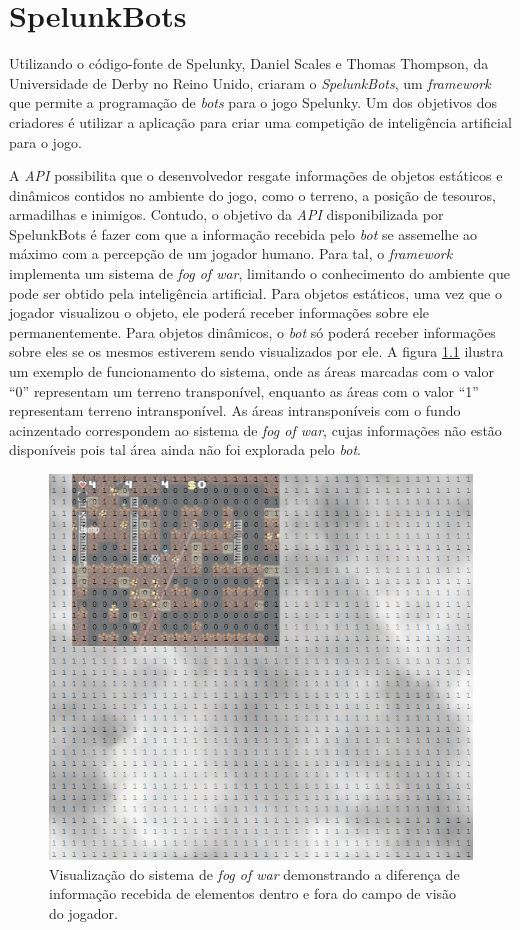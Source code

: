 \chapter{\label{chap:spelunkbots}SpelunkBots}

Utilizando o código-fonte de Spelunky, Daniel Scales e Thomas Thompson, da
Universidade de Derby no Reino Unido, criaram o
\textit{SpelunkBots}\cite{SPELUNKBOTSPAPER}, um
\textit{framework} que permite a programação de \textit{bots} para o jogo
Spelunky. Um dos objetivos dos criadores é utilizar a aplicação para criar uma
competição de inteligência artificial para o jogo.

A \textit{API} possibilita que o desenvolvedor resgate informações de objetos
estáticos e dinâmicos contidos no ambiente do jogo, como o terreno, a
posição de tesouros, armadilhas e inimigos. Contudo, o objetivo da \textit{API}
disponibilizada por SpelunkBots é fazer com que a informação recebida pelo
\textit{bot} se assemelhe ao máximo com a percepção de um jogador humano.  Para
tal, o \textit{framework} implementa um sistema de \textit{fog of war},
limitando o conhecimento do ambiente que pode ser obtido pela inteligência
artificial. Para objetos estáticos, uma vez que o jogador visualizou o objeto,
ele poderá receber informações sobre ele permanentemente. Para objetos
dinâmicos, o \textit{bot} só poderá receber informações sobre eles se os mesmos
estiverem sendo visualizados por ele. A figura \ref{fig:spelunkbots-fow} ilustra
um exemplo de funcionamento do sistema, onde as áreas marcadas com o valor ``0''
representam um terreno transponível, enquanto as áreas com o valor ``1''
representam terreno intransponível. As áreas intransponíveis com o fundo
acinzentado correspondem ao sistema de \textit{fog of war}, cujas informações
não estão disponíveis pois tal área ainda não foi explorada pelo \textit{bot}.

\begin{figure}[htb!]
\centering
\includegraphics[width=.65\textwidth]{fig/spelunkbots-fow.png}
\caption {\label{fig:spelunkbots-fow}Visualização do sistema de \textit{fog of
war} demonstrando a diferença de informação recebida de elementos dentro e fora
do campo de visão do jogador.}
\end{figure}

